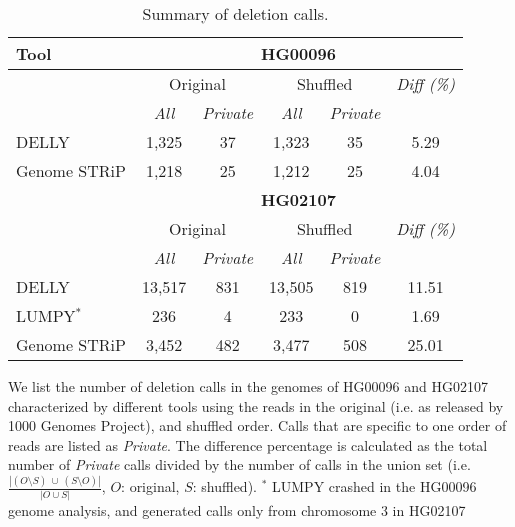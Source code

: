 \documentclass{bioinfo}
\begin{document}
\begin{methods}
\begin{table}[htb]
\caption{Summary of deletion calls.}
\begin{center}
\begin{tabular}{|l|c|c||c|c||c|}
\hline
{\bf Tool} & \multicolumn{5}{|c|}{\bf HG00096} \\
\hline
{\bf } & \multicolumn{2}{c||}{Original} & \multicolumn{2}{c||}{Shuffled} & {\it Diff (\%) } \\
\cline{2-6}
{\bf } & {\it All } & {\it Private } & {\it All } & {\it Private } & {\it }\\
\hline
DELLY & 1,325 & 37 & 1,323 & 35 & 5.29 \\
Genome STRiP & 1,218 & 25 & 1,212 & 25 & 4.04 \\
\hline
\hline
{\bf } & \multicolumn{5}{|c|}{\bf HG02107} \\
\hline
{\bf } & \multicolumn{2}{c||}{Original} & \multicolumn{2}{c||}{Shuffled} & {\it Diff (\%) } \\
\cline{2-6}
{\bf } & {\it All } & {\it Private } & {\it All } & {\it Private } & {\it }\\
\hline
DELLY & 13,517 & 831 & 13,505 & 819 & 11.51 \\
LUMPY$^*$ & 236 & 4 & 233 & 0 & 1.69 \\
Genome STRiP & 3,452 & 482 & 3,477 & 508 & 25.01 \\
\hline
\end{tabular}
\end{center}
{\footnotesize  We list the number of deletion calls in the genomes of HG00096 and HG02107 characterized by different tools using the reads in the original (i.e. as released by 1000 Genomes Project), and shuffled order.
  Calls that are specific to one order of reads are listed as {\it Private}. The difference percentage is calculated as the total number of {\it Private} calls divided by the number of calls in the union set  (i.e. $\frac{|(O\setminus S)~\cup~ (S\setminus O)|}{|O\cup S|}$, $O$: original, $S$: shuffled). $^*$ LUMPY crashed in the HG00096 genome analysis, and generated calls only from chromosome 3 in HG02107}
\label{tab:dels-orig-vs-shuf}
\end{table}


\end{methods}
\end{document}
